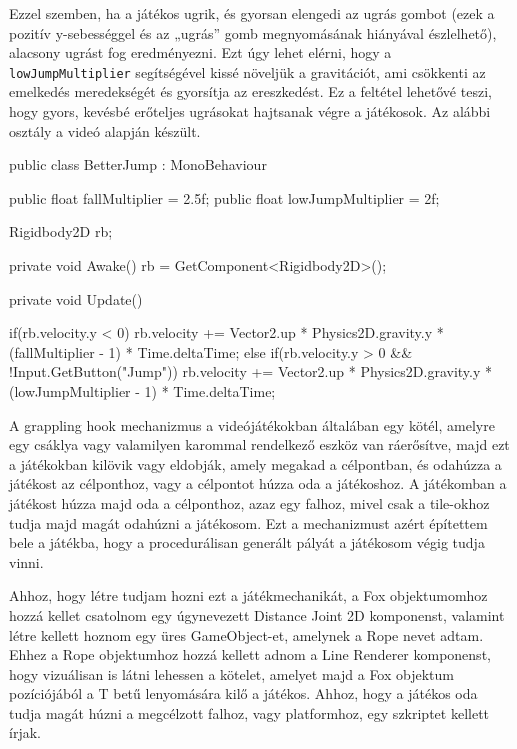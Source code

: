Ezzel szemben, ha a játékos ugrik, és gyorsan elengedi az ugrás gombot (ezek a pozitív y-sebességgel és az „ugrás” gomb megnyomásának hiányával észlelhető), alacsony ugrást fog eredményezni. Ezt úgy lehet elérni, hogy a \texttt{lowJumpMultiplier} segítségével kissé növeljük a gravitációt, ami csökkenti az emelkedés meredekségét és gyorsítja az ereszkedést. Ez a feltétel lehetővé teszi, hogy gyors, kevésbé erőteljes ugrásokat hajtsanak végre a játékosok. Az alábbi osztály a \cite{betterjump} videó alapján készült.

\begin{java}
public class BetterJump : MonoBehaviour
{
    public float fallMultiplier = 2.5f;
    public float lowJumpMultiplier = 2f;

    Rigidbody2D rb;

    private void Awake()
    {
        rb = GetComponent<Rigidbody2D>();
    }

    private void Update()
    {
        if(rb.velocity.y < 0) 
        {
            rb.velocity += 
                Vector2.up * Physics2D.gravity.y * 
                (fallMultiplier - 1) * Time.deltaTime;
        }
        else if(rb.velocity.y > 0 && !Input.GetButton("Jump"))
        {
            rb.velocity += 
                Vector2.up * Physics2D.gravity.y * 
                (lowJumpMultiplier - 1) * Time.deltaTime;
        }
        
    }
}
\end{java}


A grappling hook mechanizmus a videójátékokban általában egy kötél, amelyre egy csáklya vagy valamilyen karommal rendelkező eszköz van ráerősítve, majd ezt a játékokban kilövik vagy eldobják, amely megakad a célpontban, és odahúzza a játékost az célponthoz, vagy a célpontot húzza oda a játékoshoz. A játékomban a játékost húzza majd oda a célponthoz, azaz egy falhoz, mivel csak a tile-okhoz tudja majd magát odahúzni a játékosom. Ezt a mechanizmust azért építettem bele a játékba, hogy a procedurálisan generált pályát a játékosom végig tudja vinni.

Ahhoz, hogy létre tudjam hozni ezt a játékmechanikát, a Fox objektumomhoz hozzá kellet csatolnom egy úgynevezett Distance Joint 2D komponenst, valamint létre kellett hoznom egy üres GameObject-et, amelynek a Rope nevet adtam. Ehhez a Rope objektumhoz hozzá kellett adnom a Line Renderer komponenst, hogy vizuálisan is látni lehessen a kötelet, amelyet majd a Fox objektum pozíciójából a T betű lenyomására kilő a játékos. Ahhoz, hogy a játékos oda tudja magát húzni a megcélzott falhoz, vagy platformhoz, egy szkriptet kellett írjak.

